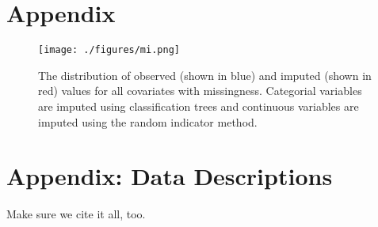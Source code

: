 \documentclass[12pt]{article}
\begin{document}
\newpage
\begin{singlespace}


\end{singlespace}

\appendix
\section{Appendix}

\begin{figure}[!htpb]
\centering
\texttt{[image: ./figures/mi.png]}
\caption{The distribution of observed (shown in blue) and imputed (shown in red) values for all covariates with missingness. Categorial variables are imputed using classification trees and continuous variables are imputed using the random indicator method.}
\label{fig:mi}
\end{figure}

\section{Appendix: Data Descriptions}

{\sf Make sure we cite it all, too.}
\end{document}
